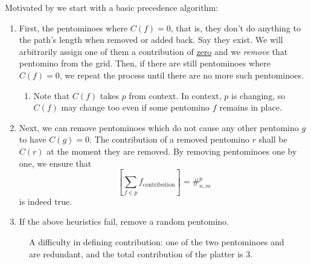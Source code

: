 \documentclass{article}
\newcommand{\pentP}{\smash{\colorbox{colorP!50}{P}}}
\newcommand{\pentT}{\smash{\colorbox{colorT!50}{T}}}
\newcommand{\highlight}[1]{\uline{#1}}
\theoremstyle{definition}%
\begin{document}
Motivated by  we start with a basic precedence algorithm:
\begin{enumerate}
\item
First, the pentominoes where $C(f) = 0$, that is, they don't do anything to the path's length when removed or added back. Say they exist. We will arbitrarily assign one of them a contribution of \highlight{zero} and we \emph{remove} that pentomino from the grid. Then, if there are still pentominoes where $C(f) = 0$, we repeat the process until there are no more such pentominoes.
\begin{enumerate}
\item Note that $C(f)$ takes $p$ from context. In context, $p$ is changing, so $C(f)$ may change too even if some pentomino $f$ remains in place.
\end{enumerate}
\item Next, we can remove pentominoes which do not cause any other pentomino $g$ to have $C(g) = 0$. The contribution of a removed pentomino $r$ shall be $C(r)$ at the moment they are removed. By removing pentominoes one by one, we ensure that
\[
\left[ \sum_{f \in p} f_{\mathrm{contribution}} \right] = \#^p_{n,m}
\]
is indeed true.
\item If the above heuristics fail, remove a random pentomino.
\end{enumerate}

\begin{figure}[p]
    \centering
    \caption{A difficulty in defining contribution: one of the two pentominoes \pentP{} and \pentT{} are redundant, and the total contribution of the platter is 3.}
    \label{fig:redundantcontribution}
\end{figure}
\end{document}
